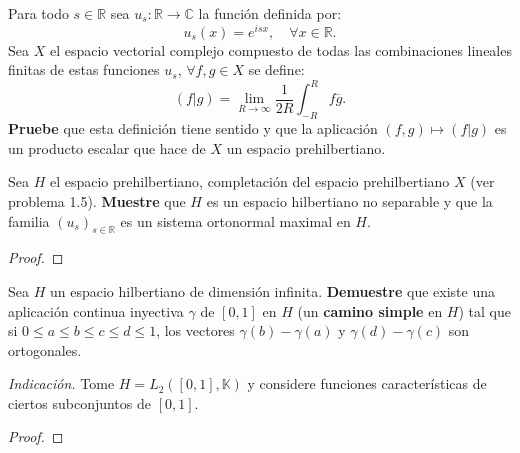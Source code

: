 \documentclass[12pt]{report}
\theoremstyle{largebreak}
\newcommand\cf[3]{\ensuremath{#1:#2\rightarrow#3}}
\newcommand\pint[2]{\ensuremath{\left(#1\big|#2\right)}}
\newcommand\conj[1]{\ensuremath{\overline{#1}}}
\begin{document}
    \begin{excer}
        Para todo $s\in\mathbb{R}$ sea $\cf{u_s}{\mathbb{R}}{\mathbb{C}}$ la función definida por:
        \begin{equation*}
            u_s(x)=e^{isx},\quad\forall x\in\mathbb{R}.
        \end{equation*}
        Sea $X$ el espacio vectorial complejo compuesto de todas las combinaciones lineales finitas de estas funciones $u_s$, $\forall f,g\in X$ se define:
        \begin{equation*}
            \pint{f}{g}=\lim_{R\rightarrow\infty}\frac{1}{2R}\int_{-R}^Rf\conj{g}.
        \end{equation*}
        \textbf{Pruebe} que esta definición tiene sentido y que la aplicación $(f,g)\mapsto\pint{f}{g}$ es un producto escalar que hace de $X$ un espacio prehilbertiano.

        Sea $H$ el espacio prehilbertiano, completación del espacio prehilbertiano $X$ (ver problema 1.5). \textbf{Muestre} que $H$ es un espacio hilbertiano no separable y que la familia $\left(u_s\right)_{s\in\mathbb{R}}$ es un sistema ortonormal maximal en $H$.
    \end{excer}

    \begin{proof}
        
    \end{proof}

    \begin{excer}
        Sea $H$ un espacio hilbertiano de dimensión infinita. \textbf{Demuestre} que existe una aplicación continua inyectiva $\gamma$ de $[0,1]$ en $H$ (un \textbf{camino simple} en $H$) tal que si $0\leq a\leq b\leq c\leq d\leq 1$, los vectores $\gamma(b)-\gamma(a)$ y $\gamma(d)-\gamma(c)$ son ortogonales.

        \textit{Indicación.} Tome $H=L_2([0,1],\mathbb{K})$ y considere funciones características de ciertos subconjuntos de $[0,1]$.
    \end{excer}

    \begin{proof}
        
    \end{proof}
\end{document}
